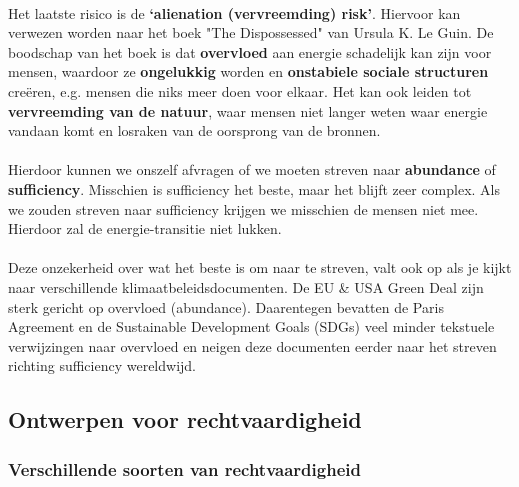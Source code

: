 \documentclass[../summary.tex]{subfiles}
\begin{document}
	\ \\
	Het laatste risico is de \textbf{`alienation (vervreemding) risk'}. Hiervoor kan verwezen worden naar het boek "The Dispossessed" van Ursula K. Le Guin. De boodschap van het boek is dat \textbf{overvloed} aan energie schadelijk kan zijn voor mensen, waardoor ze \textbf{ongelukkig} worden en \textbf{onstabiele sociale structuren} creëren, e.g. mensen die niks meer doen voor elkaar. Het kan ook leiden tot \textbf{vervreemding van de natuur}, waar mensen niet langer weten waar energie vandaan komt en losraken van de oorsprong van de bronnen.\\
	\\
	Hierdoor kunnen we onszelf afvragen of we moeten streven naar \textbf{abundance} of \textbf{sufficiency}. Misschien is sufficiency het beste, maar het blijft zeer complex. Als we zouden streven naar sufficiency krijgen we misschien de mensen niet mee. Hierdoor zal de energie-transitie niet lukken.\\
	\\
	Deze onzekerheid over wat het beste is om naar te streven, valt ook op als je kijkt naar verschillende klimaatbeleidsdocumenten. De EU \& USA Green Deal zijn sterk gericht op overvloed (abundance). Daarentegen bevatten de Paris Agreement en de Sustainable Development Goals (SDGs) veel minder tekstuele verwijzingen naar overvloed en neigen deze documenten eerder  naar het streven richting sufficiency wereldwijd.
	\newpage
	
	\subsection{Ontwerpen voor rechtvaardigheid}
	
	\subsubsection{Verschillende soorten van rechtvaardigheid}
	
\end{document}
